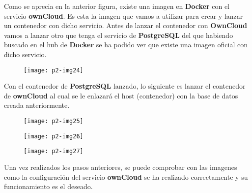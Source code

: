 \documentclass[10pt]{article}
\begin{document}
Como se aprecia en la anterior figura, existe una imagen en \textbf{Docker} con el servicio \textbf{ownCloud}. Es esta la imagen que vamos a utilizar para crear y lanzar un contenedor con dicho servicio. Antes de lanzar el contenedor con \textbf{OwnCloud} vamos a lanzar otro que tenga el servicio de \textbf{PostgreSQL} del que habiendo buscado en el hub de \textbf{Docker} se ha podido ver que existe una imagen oficial con dicho servicio.\\

 \begin{figure}[H]
	\begin{center}
 		\texttt{[image: p2-img24]}
	\end{center} 
\end{figure}

Con el contenedor de \textbf{PostgreSQL} lanzado, lo siguiente es lanzar el contenedor de \textbf{ownCloud} al cual se le enlazará el host (contenedor) con la base de datos creada anteriormente. \\ 

  \begin{figure}[H]
	\begin{center}
 		\texttt{[image: p2-img25]}
	\end{center} 
\end{figure}

  \begin{figure}[H]
	\begin{center}
 		\texttt{[image: p2-img26]}
	\end{center} 
\end{figure}

  \begin{figure}[H]
	\begin{center}
 		\texttt{[image: p2-img27]}
	\end{center} 
\end{figure}

Una vez realizados los pasos anteriores, se puede comprobar con las imagenes como la configuración del servicio \textbf{ownCloud} se ha realizado correctamente y su funcionamiento es el deseado. \\
\end{document}
